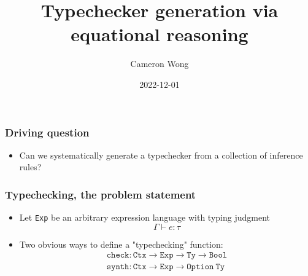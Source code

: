 \documentclass[usenames,dvipsnames]{beamer}
\title[]{Typechecker generation via equational reasoning}
\author{Cameron Wong} %
\institute[CS-252R]{CS-252R final project}
\date{2022-12-01} %
\newcommand{\Exp}{\texttt{Exp}}
\newcommand{\Type}{\texttt{Ty}}
\newcommand{\Ctx}{\texttt{Ctx}}
\newcommand{\synth}{\texttt{synth}}
\renewcommand{\check}{\texttt{check}}
\newcommand{\Bool}{\texttt{Bool}}
\begin{document}
\begin{frame}
\titlepage %
\end{frame}



\begin{frame}
  \frametitle{Driving question}

  \begin{itemize}
    \item Can we systematically generate a typechecker from a collection of
      inference rules?
  \end{itemize}
\end{frame}


\begin{frame}
  \frametitle{Typechecking, the problem statement}

  \begin{itemize}
    \item Let \Exp{} be an arbitrary expression language with typing judgment
      \begin{equation*}
        \Gamma \vdash e : \tau
      \end{equation*}
    \item Two obvious ways to define a "typechecking" function:
      \begin{align}
        \check : \Ctx \rightarrow \Exp \rightarrow \Type \rightarrow \Bool \\
        \synth : \Ctx \rightarrow \Exp \rightarrow \texttt{Option}\ \Type
      \end{align}
  \end{itemize}
\end{frame}
\end{document}
